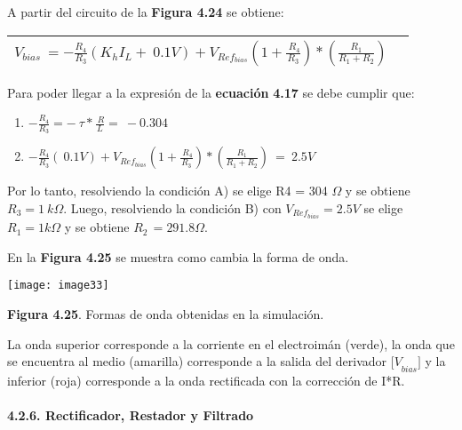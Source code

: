 \documentclass{article} %
\begin{document}
\noindent 

\noindent A partir del circuito de la \textbf{Figura 4.24 }se obtiene:

\noindent 

\begin{tabular}{|p{3.9in}|p{0.4in}|} \hline 
$V_{bias}\ =-\frac{R_4}{R_3}(K_hI_L+\ 0.1V)+V_{Ref_{bias}}(1+\frac{\ R_4}{R_3})*(\frac{R_1}{R_1+R_2})$ &   \\ \hline 
\end{tabular}



\noindent Para poder llegar a la expresi\'{o}n de la \textbf{ecuaci\'{o}n} \textbf{4.17 }se debe cumplir que:

\noindent 

\begin{enumerate}
\item  $-\frac{R_4}{R_3}=-\ \tau *\frac{\ R}{L}=\ -0.304$  

\item  $-\frac{R_4}{R_3}(\ 0.1V)+V_{Ref_{bias}}(1+\frac{\ R_4}{R_3})*(\frac{R_1}{R_1+R_2})\ =\ 2.5V$     
\end{enumerate}

\noindent 

\noindent Por lo tanto, resolviendo la condici\'{o}n A) se elige R4 = 304 $\mathit{\Omega}$ y se obtiene $R_3=1\ k\mathit{\Omega}$. Luego, resolviendo la condici\'{o}n B) con $V_{Ref_{bias}}=2.5V$ se elige $R_1=1k\mathit{\Omega}$ y se obtiene $R_{2\ }=291.8\mathit{\Omega}.$

\noindent 

\noindent En la \textbf{Figura 4.25} se muestra como cambia la forma de onda.

\noindent \texttt{[image: image33]}

\noindent \textbf{Figura 4.25}. Formas de onda obtenidas en la simulaci\'{o}n.

\noindent 

\noindent La onda superior corresponde a la corriente en el electroim\'{a}n (verde), la onda que se encuentra al medio (amarilla) corresponde a la salida del derivador ${[V}_{bias}$$]$ y la inferior (roja) corresponde a la onda rectificada con la correcci\'{o}n de I*R.

\noindent 

\noindent 

\noindent 
\paragraph{4.2.6. Rectificador, Restador y Filtrado}
\end{document}
